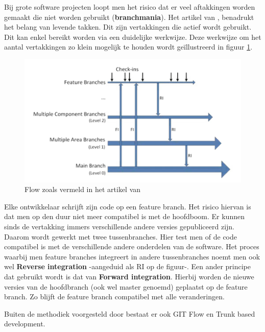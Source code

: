 
Bij grote software projecten loopt men het risico dat er veel aftakkingen worden gemaakt die niet worden gebruikt (\textbf{branchmania}). Het artikel van \textcite{Bird2012}, benadrukt het belang van levende takken. Dit zijn vertakkingen die actief wordt gebruikt. Dit kan enkel bereikt worden via een duidelijke werkwijze. Deze werkwijze om het aantal vertakkingen zo klein mogelijk te houden wordt geïllustreerd in figuur \ref{fig_mic_flow}.

\begin{figure}
\begin{center}
  	\includegraphics[scale=1]{microsoft-branching.png}
\end{center}
\caption[Voorbeeld flow]{Flow zoals vermeld in het artikel van  \textcite{Bird2012}}\label{fig_mic_flow}
\end{figure}

Elke ontwikkelaar schrijft zijn code op een feature branch. Het risico hiervan is dat men op den duur niet meer compatibel is met de hoofdboom. Er kunnen sinds de vertakking immers verschillende andere versies gepubliceerd zijn. Daarom wordt gewerkt met twee tussenbranches. Hier test men of de code compatibel is met de verschillende andere onderdelen van de software. Het proces waarbij men feature branches integreert in andere tussenbranches noemt men ook wel \textbf{Reverse integration} -aangeduid als RI op de figuur-. Een ander principe dat gebruikt wordt is dat van \textbf{Forward integration}. Hierbij worden de nieuwe versies van de hoofdbranch (ook wel master genoemd) geplaatst op de feature branch. Zo blijft de feature branch compatibel met alle veranderingen.

Buiten de methodiek voorgesteld door \textcite{Bird2012} bestaat er ook GIT Flow en Trunk based development. 


